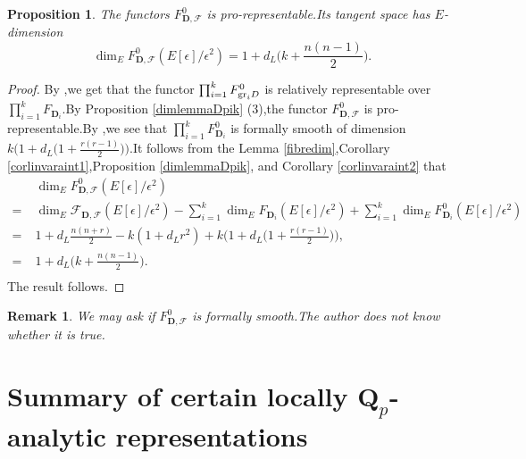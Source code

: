 \documentclass[SecEq,CM,GP]{degruyter-crelle} %
\theoremstyle{plain}
\newtheorem{pro}[thm]{Proposition}
\newtheorem{rmk}[thm]{Remark}
\newcommand{\Dpik}{{\mathbf{D}}}
\newcommand{\gr}{{\rm gr}}
\newcommand{\bQ}{{\mathbf{Q}}}
\newcommand{\cF}{\mathcal F}
\newcommand{\sF}{\mathscr F}
\begin{document}
\begin{pro}\label{dimtanFD0}	The functors $F_{\Dpik,\cF}^0$ is  pro-representable.\;Its tangent space has $E$-dimension $$\dim_EF_{\Dpik,\cF}^0(E[\epsilon]/\epsilon^2)=1+d_L\Big(k+\frac{n(n-1)}{2}\Big).$$
\end{pro}
\begin{proof}By \cite[Proposition 4.1.3]{Ding2021},\;we get that the functor $\prod_{i=1}^k F_{\gr_iD}^0$ is relatively representable over $\prod_{i=1}^k F_{\Dpik_i}$.\;By Proposition \ref{dimlemmaDpik} (3),\;the functor $F_{\Dpik,\cF}^0$ is pro-representable.\;By \cite[Proposition 4.1.4]{Ding2021},\;we see that $\prod_{i=1}^k F_{\Dpik_i}^0$ is formally smooth of dimension $k\big(1+d_L\big(1+\frac{r(r-1)}{2}\big)\big)$.\;It follows from the Lemma \ref{fibredim},\;Corollary \ref{corlinvaraint1},\;Proposition \ref{dimlemmaDpik},\;\cite[Proposition 4.1.4]{Ding2021} and Corollary \ref{corlinvaraint2} that 
\begin{equation}
	\begin{aligned}
		&\dim_EF_{\Dpik,\cF}^0(E[\epsilon]/\epsilon^2)\\
		=\;&\dim_E\sF_{\Dpik,\cF}(E[\epsilon]/\epsilon^2)-\sum_{i=1}^k\dim_EF_{\Dpik_i}(E[\epsilon]/\epsilon^2)+\sum_{i=1}^k\dim_EF^0_{\Dpik_i}(E[\epsilon]/\epsilon^2)\\
		=\;&1+d_L\frac{n(n+r)}{2}-k(1+d_Lr^2)+k\Big(1+d_L\Big(1+\frac{r(r-1)}{2}\Big)\Big),\\
		=\;&1+d_L\Big(k+\frac{n(n-1)}{2}\Big).\\
\end{aligned}\end{equation}
The result follows.\;
\end{proof}
\begin{rmk}We may ask if $F_{\Dpik,\cF}^0$ is formally smooth.\;The author does not know whether it is true.\;
\end{rmk}



\section{Summary of certain locally \texorpdfstring{$\bQ_p$}{Lg}-analytic representations}\label{BreuilLINVSUMMMANY}
\end{document}
